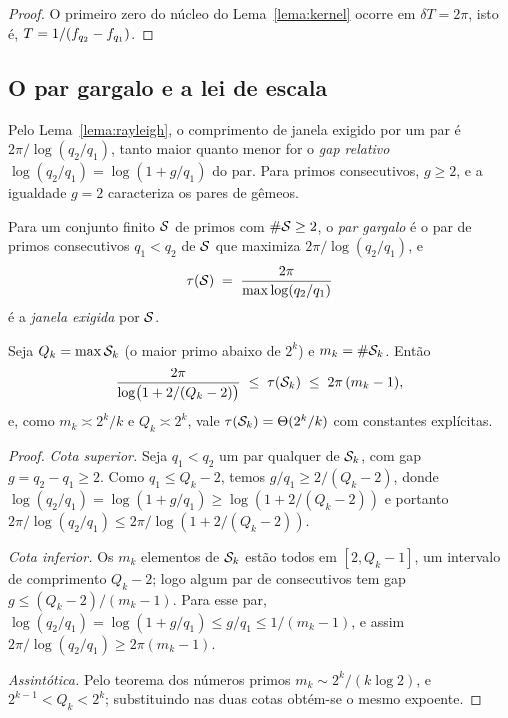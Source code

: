 \begin{proof}
O primeiro zero do núcleo do Lema~\ref{lema:kernel} ocorre em
$\delta T=2\pi$, isto é, $T=1/(f_{q_2}-f_{q_1})$.
\end{proof}

\subsection{O par gargalo e a lei de escala}

Pelo Lema~\ref{lema:rayleigh}, o comprimento de janela exigido por um par é
$2\pi/\log(q_2/q_1)$, tanto maior quanto menor for o \emph{gap relativo}
$\log(q_2/q_1)=\log(1+g/q_1)$ do par. Para primos consecutivos, $g\ge2$, e a
igualdade $g=2$ caracteriza os pares de gêmeos.

\begin{definicao}\label{def:gargalo}
Para um conjunto finito $\mathcal{S}$ de primos com $\#\mathcal{S}\ge2$, o \emph{par gargalo} é
o par de primos consecutivos $q_1<q_2$ de $\mathcal{S}$ que maximiza
$2\pi/\log(q_2/q_1)$, e
\[
  \tau(\mathcal{S}) \;=\; \frac{2\pi}{\max\log(q_2/q_1)}
\]
é a \emph{janela exigida} por $\mathcal{S}$.
\end{definicao}

\begin{teorema}\label{teo:custo}
Seja $Q_k=\max \mathcal{S}_k$ (o maior primo abaixo de $2^k$) e $m_k=\#\mathcal{S}_k$. Então
\[
  \frac{2\pi}{\log\bigl(1+2/(Q_k-2)\bigr)}
  \;\le\; \tau(\mathcal{S}_k) \;\le\; 2\pi\,(m_k-1),
\]
e, como $m_k\asymp 2^k/k$ e $Q_k\asymp 2^k$, vale
$\tau(\mathcal{S}_k)=\Theta(2^k/k)$ com constantes explícitas.
\end{teorema}

\begin{proof}
\emph{Cota superior.} Seja $q_1<q_2$ um par qualquer de $\mathcal{S}_k$, com gap
$g=q_2-q_1\ge2$. Como $q_1\le Q_k-2$, temos $g/q_1\ge 2/(Q_k-2)$, donde
$\log(q_2/q_1)=\log(1+g/q_1)\ge\log(1+2/(Q_k-2))$ e portanto
$2\pi/\log(q_2/q_1)\le 2\pi/\log(1+2/(Q_k-2))$.

\emph{Cota inferior.} Os $m_k$ elementos de $\mathcal{S}_k$ estão todos em
$[2,Q_k-1]$, um intervalo de comprimento $Q_k-2$; logo algum par de consecutivos
tem gap $g\le (Q_k-2)/(m_k-1)$. Para esse par,
$\log(q_2/q_1)=\log(1+g/q_1)\le g/q_1\le 1/(m_k-1)$, e assim
$2\pi/\log(q_2/q_1)\ge 2\pi(m_k-1)$.

\emph{Assintótica.} Pelo teorema dos números primos $m_k\sim 2^k/(k\log2)$, e
$2^{k-1}<Q_k<2^k$; substituindo nas duas cotas obtém-se o mesmo expoente.
\end{proof}

